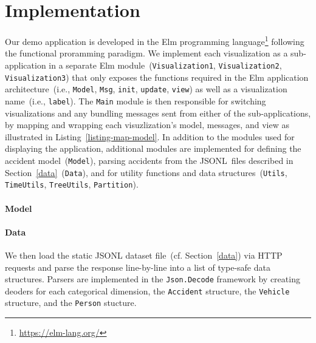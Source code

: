 \section{Implementation}
\label{implementation}
\begin{listing}
    
    \caption{Example of wrapping the \lstinline{update} function from \lstinline{Visualization1} inside the \lstinline{Main} module's \lstinline{update} function. Commands sent from \lstinline{Visualization1} are then mapped to the \lstinline{Main} modules types.}
    \label{listing-map-model}
\end{listing}
Our demo application is developed in the Elm programming language\footnote{\url{https://elm-lang.org/}} following the functional proramming paradigm. We implement each visualization as a sub-application in a separate Elm module~(\lstinline{Visualization1}, \lstinline{Visualization2}, \lstinline{Visualization3}) that only exposes the functions required in the Elm application architecture~(i.e., \lstinline{Model}, \lstinline{Msg}, \lstinline{init}, \lstinline{update}, \lstinline{view}) as well as a visualization name~(i.e., \lstinline{label}). The \lstinline{Main} module is then responsible for switching visualizations and any bundling messages sent from either of the sub-applications, by mapping and wrapping each visuzlization's model, messages, and view as illustrated in Listing~\ref{listing-map-model}. In addition to the modules used for displaying the application, additional modules are implemented for defining the accident model~(\lstinline{Model}), parsing accidents from the JSONL~files described in Section~\ref{data}~(\lstinline{Data}), and for utility functions and data structures~(\lstinline{Utils}, \lstinline{TimeUtils}, \lstinline{TreeUtils}, \lstinline{Partition}).

\paragraph{Model}

\paragraph{Data}
We then load the static JSONL dataset file~(cf. Section~\ref{data}) via HTTP requests and parse the response line-by-line into a list of type-safe data structures. Parsers are implemented in the \lstinline{Json.Decode} framework by creating deoders for each categorical dimension, the \lstinline{Accident} structure, the \lstinline{Vehicle} structure, and the \lstinline{Person} stucture.

